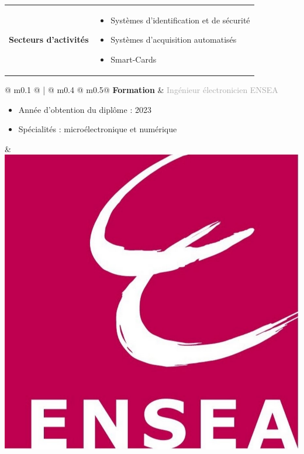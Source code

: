 \documentclass{article}
\begin{document}
\begin{center}
\end{center}


\begin{tabular}{@{\hspace{0.05\textwidth}}m{}@{\hspace{0.05\textwidth}}!{\color{secondaryBlue}\vline width 2pt}@{}C{0.7\textwidth}@{}}
    \textcolor{secondaryBlue}{\textbf{Secteurs d'activités}} & 
    \begin{itemize}[label={}, topsep=0pt, partopsep=0pt, itemsep=0.5pt, parsep=2pt, after=\vspace*{-\baselineskip}]
        \item \textcolor{gray!80}{Systèmes d'identification et de sécurité}
        \item \textcolor{gray!80}{Systèmes d'acquisition automatisés}
        \item \textcolor{gray!80}{Smart-Cards}
    \end{itemize}
\end{tabular}



\begin{center}
\end{center}


\begin{tabular}{@{\hspace{0.05\textwidth}} m{0.1\textwidth} @ {\hspace{0.05\textwidth}} ! {\color{secondaryBlue}\vline width 2pt \hspace{0.04\textwidth}} @ {}m{0.4\textwidth} @{\hspace{0.15\textwidth}} m{0.5\linewidth}@{}}
    \textcolor{secondaryBlue}{\textbf{Formation}} & 
    \textcolor{darkGray}{Ingénieur électronicien ENSEA}
    \begin{itemize}[label={\textcolor{gray!80}{\checkmark}}, topsep=0pt, partopsep=0pt, itemsep=0.5pt, parsep=2pt, after=\vspace*{-\baselineskip}]
        \item \textcolor{gray!80}{Année d'obtention du diplôme : 2023} 
        \item \textcolor{gray!80}{Spécialités : microélectronique et numérique} 
    \end{itemize} &
    \includegraphics[width=0.1\linewidth]{ensea.jpg}
\end{tabular}
\end{document}
